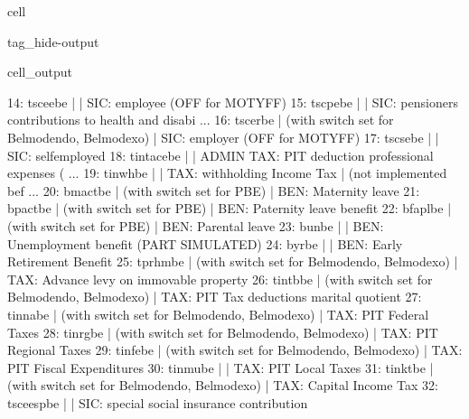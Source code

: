 \documentclass[letterpaper,10pt,english]{sphinxmanual}
\begin{document}
\begin{sphinxuseclass}{cell}
\begin{sphinxuseclass}{tag_hide-output}
\begin{sphinxuseclass}{cell_output}
\begin{sphinxVerbatim}[commandchars=\\\{\}]
14: tscee\PYGZus{}be             |                                                       |    SIC: employee (OFF for MOTYFF) 
15: tscpe\PYGZus{}be             |                                                       |    SIC: pensioners contributions to health and disabi ... 
16: tscer\PYGZus{}be             |  (with switch set for Belmod\PYGZus{}endo, Belmod\PYGZus{}exo)        |    SIC: employer (OFF for MOTYFF) 
17: tscse\PYGZus{}be             |                                                       |    SIC: self\PYGZhy{}employed 
18: tintace\PYGZus{}be           |                                                       |    ADMIN TAX: PIT \PYGZhy{} deduction professional expenses ( ... 
19: tinwh\PYGZus{}be             |                                                       |    TAX: withholding Income Tax | (not implemented bef ... 
20: bmact\PYGZus{}be             |  (with switch set for PBE)                            |    BEN: Maternity leave 
21: bpact\PYGZus{}be             |  (with switch set for PBE)                            |    BEN: Paternity leave benefit 
22: bfapl\PYGZus{}be             |  (with switch set for PBE)                            |    BEN: Parental leave 
23: bun\PYGZus{}be               |                                                       |    BEN: Unemployment benefit (PART SIMULATED)  
24: byr\PYGZus{}be               |                                                       |    BEN: Early Retirement Benefit 
25: tprhm\PYGZus{}be             |  (with switch set for Belmod\PYGZus{}endo, Belmod\PYGZus{}exo)        |    TAX: Advance levy on immovable property 
26: tintb\PYGZus{}be             |  (with switch set for Belmod\PYGZus{}endo, Belmod\PYGZus{}exo)        |    TAX: PIT \PYGZhy{} Tax deductions \PYGZam{} marital quotient 
27: tinna\PYGZus{}be             |  (with switch set for Belmod\PYGZus{}endo, Belmod\PYGZus{}exo)        |    TAX: PIT \PYGZhy{} Federal Taxes 
28: tinrg\PYGZus{}be             |  (with switch set for Belmod\PYGZus{}endo, Belmod\PYGZus{}exo)        |    TAX: PIT \PYGZhy{} Regional Taxes 
29: tinfe\PYGZus{}be             |  (with switch set for Belmod\PYGZus{}endo, Belmod\PYGZus{}exo)        |    TAX: PIT \PYGZhy{} Fiscal Expenditures 
30: tinmu\PYGZus{}be             |                                                       |    TAX: PIT \PYGZhy{} Local Taxes 
31: tinkt\PYGZus{}be             |  (with switch set for Belmod\PYGZus{}endo, Belmod\PYGZus{}exo)        |    TAX: Capital Income Tax 
32: tsceesp\PYGZus{}be           |                                                       |    SIC: special social insurance contribution 

\end{sphinxVerbatim}
\end{sphinxuseclass}
\end{sphinxuseclass}
\end{sphinxuseclass}
\end{document}
